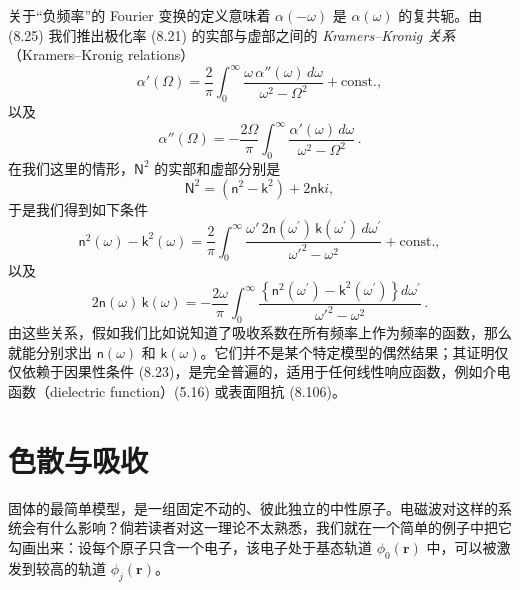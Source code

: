 关于“负频率”的 Fourier 变换的定义意味着 $\alpha(-\omega)$ 是 $\alpha(\omega)$ 的复共轭。由 (8.25) 我们推出极化率 (8.21) 的实部与虚部之间的 \emph{Kramers--Kronig 关系}（Kramers--Kronig relations）
\begin{equation*}
\alpha'(\Omega) = \frac{2}{\pi}\int_0^{\infty}\frac{\omega\,\alpha''(\omega)\,d\omega}{\omega^2-\Omega^2} + \mathrm{const.},\tag{8.26}
\end{equation*}
以及
\begin{equation*}
\alpha''(\Omega) = -\frac{2\Omega}{\pi}\int_0^{\infty}\frac{\alpha'(\omega)\,d\omega}{\omega^2-\Omega^2}\,.\tag{8.27}
\end{equation*}
在我们这里的情形，$\mathsf{N}^2$ 的实部和虚部分别是
\begin{equation*}
\mathsf{N}^2 = (\mathsf{n}^2 - \mathsf{k}^2) + 2\mathsf{n}\mathsf{k}i,\tag{8.28}
\end{equation*}
于是我们得到如下条件
\begin{equation*}
\mathsf{n}^2(\omega) - \mathsf{k}^2(\omega) = \frac{2}{\pi}\int_0^{\infty}\frac{\omega'\,2\mathsf{n}(\omega^{\prime})\,\mathsf{k}(\omega^{\prime})\,d\omega^{\prime}}{\omega'^{2}-\omega^{2}} + \mathrm{const.},\tag{8.29}
\end{equation*}
以及
\begin{equation*}
2\mathsf{n}(\omega)\,\mathsf{k}(\omega) = -\frac{2\omega}{\pi}\int_0^{\infty}\frac{\left\{\mathsf{n}^2(\omega^{\prime}) - \mathsf{k}^2(\omega^{\prime})\right\}d\omega^{\prime}}{\omega'^{2}-\omega^{2}}\,.\tag{8.30}
\end{equation*}
由这些关系，假如我们比如说知道了吸收系数在所有频率上作为频率的函数，那么就能分别求出 $\mathsf{n}(\omega)$ 和 $\mathsf{k}(\omega)$。它们并不是某个特定模型的偶然结果；其证明仅仅依赖于因果性条件 (8.23)，是完全普遍的，适用于任何线性响应函数，例如介电函数（dielectric function）(5.16) 或表面阻抗 (8.106)。

\section{色散与吸收}

固体的最简单模型，是一组固定不动的、彼此独立的中性原子。电磁波对这样的系统会有什么影响？倘若读者对这一理论不太熟悉，我们就在一个简单的例子中把它勾画出来：设每个原子只含一个电子，该电子处于基态轨道 $\phi_0(\mathbf{r})$ 中，可以被激发到较高的轨道 $\phi_j(\mathbf{r})$。

